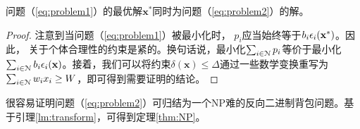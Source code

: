 	\begin{lm}\label{lm:transform}
		问题（\ref{eq:problem1}）的最优解$\mathbf{x}^*$同时为问题（\ref{eq:problem2}）的解。
	\end{lm}
	\begin{proof}
		注意到当问题（\ref{eq:problem1}）被最小化时， $p_i$应当始终等于$b_i\epsilon_i(\mathbf{x}^*)$。因此， 关于个体合理性的约束是紧的。换句话说，最小化$\sum_{i\in\mathcal{N}}p_i$等价于最小化$\sum_{i\in\mathcal{N}}b_i\epsilon_i(\mathbf{x})$。接着，我们可以将约束$\delta(\mathbf{x})\le \Delta$通过一些数学变换重写为$\sum_{i\in\mathcal{N}}w_ix_i\ge W$，即可得到需要证明的结论。
	\end{proof}
	很容易证明问题​​（\ref{eq:problem2}）可归结为一个NP难的反向二进制背包问题。基于引理\ref{lm:transform}，可得到定理\ref{thm:NP}。
	
	
